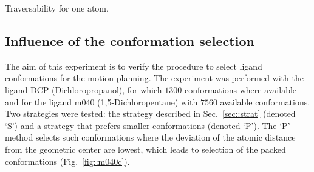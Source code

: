 \documentclass[usletter, 10pt, conference]{ieeeconf} %
\def\LA{L_1}
\def\LB{L_2}
\begin{document}
\begin{table}
\centering
\caption{\label{tab::one}Traversability for one atom.}
\renewcommand{\tabcolsep}{4.3pt}
{\small

}
\end{table}


%
%





%

\subsection{Influence of the conformation selection}

The aim of this experiment is to verify the procedure to select ligand conformations for the motion planning.
The experiment was performed with the ligand DCP (Dichloropropanol), for which $1300$ conformations where available and for the ligand
m040 (1,5-Dichloropentane) with $7560$ available conformations.
Two strategies were tested: the strategy described in Sec.~\ref{sec::strat} (denoted `S') and a strategy that prefers smaller conformations (denoted `P').
The `P' method selects such conformations where the deviation of the atomic distance from the geometric center are lowest, which leads 
to selection of the packed conformations (Fig.~\ref{fig::m040c}).
\end{document}
